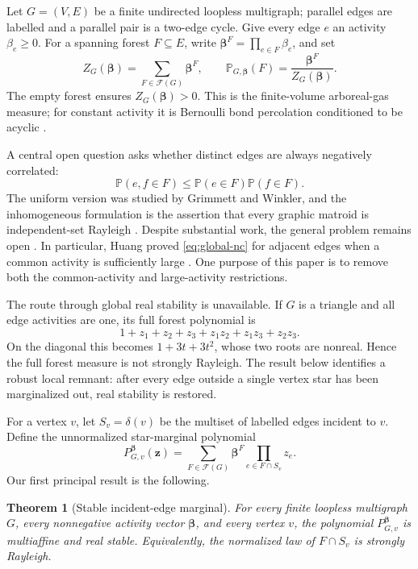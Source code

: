 \documentclass[11pt]{article}
\numberwithin{equation}{section}
\newtheorem{theorem}{Theorem}[section]
\newcommand{\cF}{\mathcal F}
\newcommand{\bbP}{\mathbb P}
\newcommand{\zz}{\bm z}
\newcommand{\betab}{\bm\beta}
\begin{document}
Let $G=(V,E)$ be a finite undirected loopless multigraph; parallel edges are labelled and a parallel pair is a two-edge cycle.  Give every edge $e$ an activity $\beta_e\geq0$.  For a spanning forest $F\subseteq E$, write $\betab^F=\prod_{e\in F}\beta_e$, and set
\begin{equation}\label{eq:partition}
 Z_G(\betab)=\sum_{F\in\cF(G)}\betab^F,
 \qquad
 \bbP_{G,\betab}(F)=\frac{\betab^F}{Z_G(\betab)}.
\end{equation}
The empty forest ensures $Z_G(\betab)>0$.  This is the finite-volume arboreal-gas measure; for constant activity it is Bernoulli bond percolation conditioned to be acyclic \cite{BauerschmidtCrawfordHelmuthSwan2021}.

A central open question asks whether distinct edges are always negatively correlated:
\begin{equation}\label{eq:global-nc}
 \bbP(e,f\in F)
 \leq
 \bbP(e\in F)\bbP(f\in F).
\end{equation}
The uniform version was studied by Grimmett and Winkler, and the inhomogeneous formulation is the assertion that every graphic matroid is independent-set Rayleigh \cite{GrimmettWinkler2004,SempleWelsh2008,ChoeWagner2006}.  Despite substantial work, the general problem remains open \cite{Huang2024,TangZhang2026}.  In particular, Huang proved \eqref{eq:global-nc} for adjacent edges when a common activity is sufficiently large \cite{Huang2024}.  One purpose of this paper is to remove both the common-activity and large-activity restrictions.

The route through global real stability is unavailable.  If $G$ is a triangle and all edge activities are one, its full forest polynomial is
\[
 1+z_1+z_2+z_3+z_1z_2+z_1z_3+z_2z_3.
\]
On the diagonal this becomes $1+3t+3t^2$, whose two roots are nonreal.  Hence the full forest measure is not strongly Rayleigh.  The result below identifies a robust local remnant: after every edge outside a single vertex star has been marginalized out, real stability is restored.

For a vertex $v$, let $S_v=\delta(v)$ be the multiset of labelled edges incident to $v$.  Define the unnormalized star-marginal polynomial
\begin{equation}\label{eq:star-polynomial-intro}
 P_{G,v}^{\betab}(\zz)
 =\sum_{F\in\cF(G)}\betab^F
   \prod_{e\in F\cap S_v}z_e.
\end{equation}
Our first principal result is the following.

\begin{theorem}[Stable incident-edge marginal]\label{thm:star-intro}
For every finite loopless multigraph $G$, every nonnegative activity vector $\betab$, and every vertex $v$, the polynomial $P_{G,v}^{\betab}$ is multiaffine and real stable.  Equivalently, the normalized law of $F\cap S_v$ is strongly Rayleigh.
\end{theorem}
\end{document}
